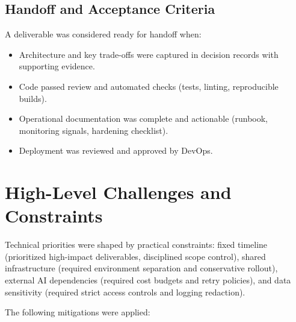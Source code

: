 \subsection{Handoff and Acceptance Criteria}
\label{subsec:OrgProfile_Acceptance}

A deliverable was considered ready for handoff when:

\begin{itemize}
    \item Architecture and key trade-offs were captured in decision records with supporting evidence.
    \item Code passed review and automated checks (tests, linting, reproducible builds).
    \item Operational documentation was complete and actionable (runbook, monitoring signals, hardening checklist).
    \item Deployment was reviewed and approved by DevOps.
\end{itemize}


\section{High-Level Challenges and Constraints}
\label{sec:OrgProfile_Challenges}

Technical priorities were shaped by practical constraints: fixed timeline (prioritized high-impact deliverables, disciplined scope control), shared infrastructure (required environment separation and conservative rollout), external AI dependencies (required cost budgets and retry policies), and data sensitivity (required strict access controls and logging redaction).

The following mitigations were applied:

